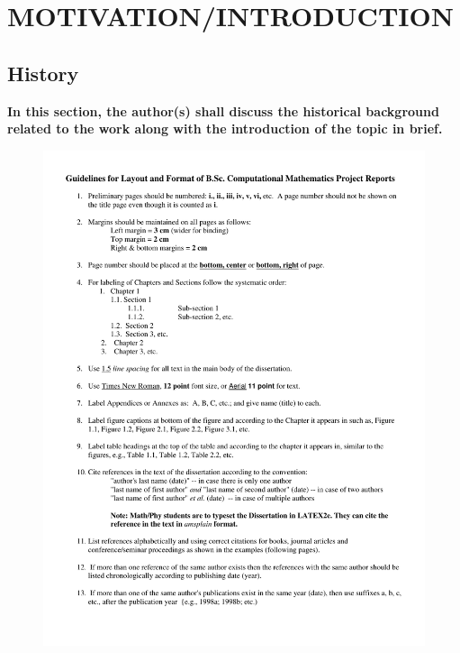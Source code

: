 

\chapter{MOTIVATION/INTRODUCTION}

\section{{\bf{History}}}
{\bf\color{red}In this section, the author(s) shall discuss the  historical background related to the work along with the introduction of the topic in brief.}
\begin{figure}[h]
	\includegraphics[scale=0.5]{figures/layout.pdf}
\end{figure}




